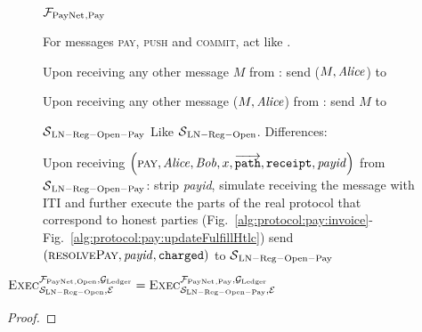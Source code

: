 \begin{figure}[H]
  \begin{systembox}{$\mathcal{F}_{\mathrm{PayNet}}{}_{\mathrm{, Pay}}$}
    \begin{algorithmic}[1]
      \State For messages \textsc{pay}, \textsc{push} and \textsc{commit}, act
      like \fpaynet{}.
      \Statex

      \State Upon receiving any other message $M$ from \alice:
      \Indent
          \State send ($M, \mathit{Alice}$) to \simulator
        \EndIf
      \EndIndent
      \Statex

      \State Upon receiving any other message ($M, \mathit{Alice}$) from \simulator:
      \Indent
          \State send $M$ to \alice
        \EndIf
      \EndIndent
    \end{algorithmic}
  \end{systembox}
  \caption{}
  \label{alg:proof:fpaynet:pay}
\end{figure}

\begin{figure}[H]
  \begin{simulatorbox}{$\mathcal{S}{}_{\mathrm{LN - Reg - Open - Pay}}$}
    Like $\mathcal{S}{}_{\mathrm{LN - Reg - Open}}$. Differences:
    \begin{algorithmic}[1]
      \State Upon receiving $\left(\textsc{pay}, \mathit{Alice}, \mathit{Bob}, x,
      \overrightarrow{\mathtt{path}}, \mathtt{receipt}, \mathit{payid}\right)$
      from $\mathcal{S}{}_{\mathrm{LN - Reg - Open - Pay}}$:
      \Indent
        \State strip \textit{payid}, simulate receiving the message with
        \alice{} ITI and further execute the parts of the real protocol that
        correspond to honest parties (Fig.~\ref{alg:protocol:pay:invoice}-
        Fig.~\ref{alg:protocol:pay:updateFulfillHtlc})
        \State {} 
        \State send $\left(\textsc{resolvePay}, \mathit{payid},
        \mathtt{charged}\right)$ to $\mathcal{S}{}_{\mathrm{LN - Reg - Open -
        Pay}}$
      \EndIndent
    \end{algorithmic}
  \end{simulatorbox}
  \caption{}
  \label{alg:sim:pay}
\end{figure}

\begin{lemma}
  \label{lemma:pay}
  $\textsc{Exec}^{\mathcal{F}_{\mathrm{PayNet}}{}_{\mathrm{, Open}},
  \mathcal{G}_{\mathrm{Ledger}}}_{\mathcal{S}_{\mathrm{LN - Reg - Open}}, \mathcal{E}} =
  \textsc{Exec}^{\mathcal{F}_{\mathrm{PayNet}}{}_{\mathrm{, Pay}}, \mathcal{G}_{\mathrm{Ledger}}}_{\mathcal{S}_{\mathrm{LN
  - Reg - Open - Pay}}, \mathcal{E}}$
\end{lemma}

\begin{proof}
\end{proof}
